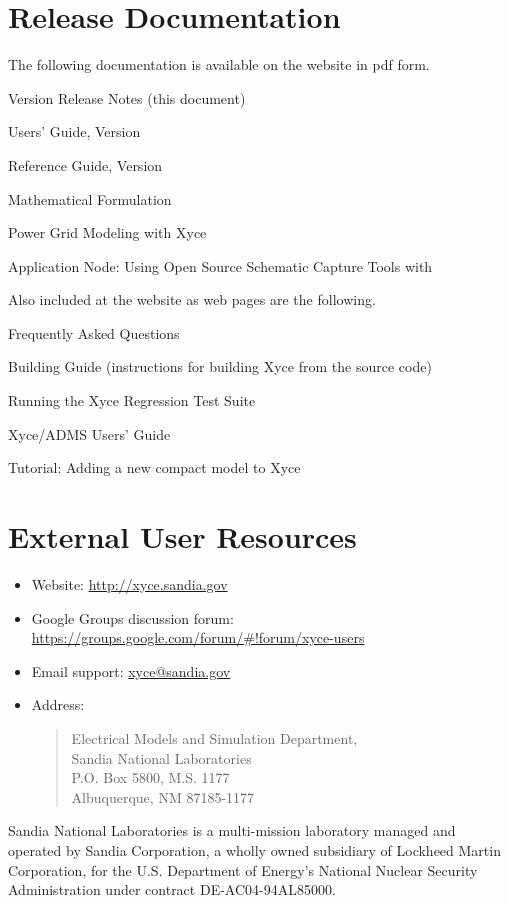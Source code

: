 \documentclass{article}
\begin{document}
\section{\Xyce{} Release \XyceVersionVar{} Documentation}
The following \Xyce{} documentation is available on the \Xyce{} website in pdf
form.
\begin{XyceItemize}
     \item \Xyce{} Version \XyceVersionVar{} Release Notes (this document)
     \item \Xyce{} Users' Guide, Version \XyceVersionVar{}
     \item \Xyce{} Reference Guide, Version \XyceVersionVar{}
     \item \Xyce{} Mathematical Formulation
     \item Power Grid Modeling with Xyce
     \item Application Node: Using Open Source Schematic Capture Tools with \Xyce{}
\end{XyceItemize}
Also included at the \Xyce{} website as web pages are the following.
\begin{XyceItemize}
     \item Frequently Asked Questions
     \item Building Guide (instructions for building Xyce from the source code)
     \item Running the Xyce Regression Test Suite
     \item Xyce/ADMS Users' Guide
     \item Tutorial:  Adding a new compact model to Xyce
\end{XyceItemize}


\section{External User Resources}
\begin{itemize}
     \item Website: {\color{XyceDeepRed}\url{http://xyce.sandia.gov}}
     \item Google Groups discussion forum:
          {\color{XyceDeepRed}\url{https://groups.google.com/forum/#!forum/xyce-users}}
     \item Email support:
          {\color{XyceDeepRed}\href{mailto:xyce@sandia.gov}{xyce@sandia.gov}}
     \item Address:
          \begin{quote}
               Electrical Models and Simulation Department,\\
               Sandia National Laboratories\\
               P.O. Box 5800, M.S. 1177\\
               Albuquerque, NM 87185-1177 \\
          \end{quote}
\end{itemize}

\vspace*{\fill}
Sandia National Laboratories is a multi-mission laboratory managed and
operated by Sandia Corporation, a wholly owned subsidiary of Lockheed Martin
Corporation, for the U.S. Department of Energy's National Nuclear Security
Administration under contract DE-AC04-94AL85000.
\end{document}
